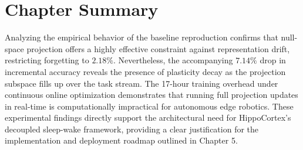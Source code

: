 \section{Chapter Summary}
\label{sec:results_summary}

Analyzing the empirical behavior of the baseline reproduction confirms that null-space projection offers a highly effective constraint against representation drift, restricting forgetting to $2.18\%$. Nevertheless, the accompanying $7.14\%$ drop in incremental accuracy reveals the presence of plasticity decay as the projection subspace fills up over the task stream. The 17-hour training overhead under continuous online optimization demonstrates that running full projection updates in real-time is computationally impractical for autonomous edge robotics. These experimental findings directly support the architectural need for HippoCortex's decoupled sleep-wake framework, providing a clear justification for the implementation and deployment roadmap outlined in Chapter 5.

